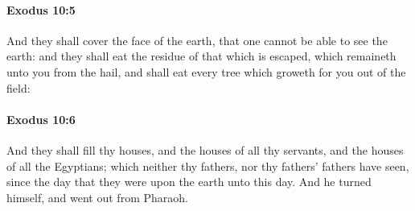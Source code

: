 		\paragraph{Exodus 10:5} %
			\label{EXODUS-10-5}

			And they shall cover the face of the earth, that one cannot be able to see the earth: and they shall eat the residue of that which is escaped, which remaineth unto you from the hail, and shall eat every tree which groweth for you out of the field:


		\paragraph{Exodus 10:6} %
			\label{EXODUS-10-6}

			And they shall fill thy houses, and the houses of all thy servants, and the houses of all the Egyptians; which neither thy fathers, nor thy fathers' fathers have seen, since the day that they were upon the earth unto this day. And he turned himself, and went out from Pharaoh.

